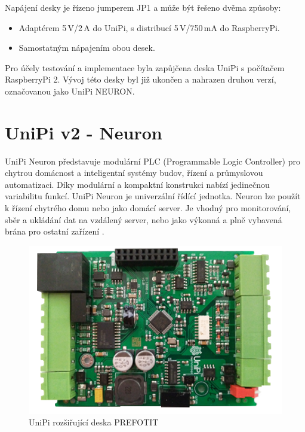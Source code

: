 Napájení desky je řízeno jumperem JP1 a může být řešeno dvěma způsoby:
\begin{itemize}
	\item Adaptérem 5\,V/2\,A do UniPi, s distribucí 5\,V/750\,mA do RaspberryPi.
	\item Samostatným nápajením obou desek.
\end{itemize}


Pro účely testování a implementace byla zapůjčena deska UniPi s počítačem RaspberryPi 2. Vývoj této desky byl již ukončen a nahrazen druhou verzí, označovanou jako UniPi NEURON.




\section{UniPi v2 - Neuron}
\label{KapitolaUnipi2}

UniPi Neuron představuje modulární PLC (Programmable Logic Controller) pro chytrou domácnost a inteligentní systémy budov, řízení a průmyslovou automatizaci. Díky modulární a kompaktní konstrukci nabízí jedinečnou variabilitu funkcí. UniPi Neuron je univerzální řídící jednotka. Neuron lze použít k řízení chytrého domu nebo jako domácí server. Je vhodný pro monitorování, sběr a ukládání dat na vzdálený server, nebo jako výkonná a plně vybavená brána pro ostatní zařízení \cite{UniPiBoard2}.

 \begin{figure}[!h]
  \begin{center}
    \includegraphics[scale=0.8]{obrazky/unipi_unipi_deska}
  \end{center}
  \caption{UniPi rozšiřující deska \colorbox[rgb]{1,0,0}{PREFOTIT}}
	\label{UnipiV2DeskaUnipi}
\end{figure}

